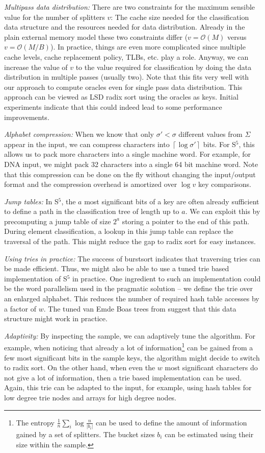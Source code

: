 \documentclass[a4paper]{myjournal}
\newcommand{\ceil}[1]{\left\lceil #1\right\rceil}
\newcommand{\Oh}[1]{\mathcal{O}\!\left( #1\right)}
\def\Oh#1{\mathcal{O}(#1)}
\begin{document}
\emph{Multipass data distribution:} There are two constraints for the maximum
sensible value for the number of splitters $v$: The cache size needed for the
classification data structure and the resources needed for data
distribution. Already in the plain external memory model these two constraints
differ ($v=\Oh{M}$ versus $v=\Oh{M/B}$). In practice, things are even more
complicated since multiple cache levels, cache replacement policy, TLBs,
etc. play a role. Anyway, we can increase the value of $v$ to the value required
for classification by doing the data distribution in multiple passes (usually
two).  Note that this fits very well with our approach to compute oracles even
for single pass data distribution. This approach can be viewed as LSD radix sort
using the oracles as keys. Initial experiments indicate that this could indeed
lead to some performance improvements.

\emph{Alphabet compression:} When we know that only $\sigma'<\sigma$ different
values from $\Sigma$ appear in the input, we can compress characters into
$\ceil{\log\sigma'}$ bits.  For S$^5$, this allows us to pack more characters
into a single machine word.  For example, for DNA input, we might pack 32
characters into a single 64 bit machine word. Note that this compression can be
done on the fly without changing the input/output format and the compression
overhead is amortized over $\log v$ key comparisons.

\emph{Jump tables:} In S$^5$, the $a$ most significant bits of a key are often
already sufficient to define a path in the classification tree of length up to
$a$.  We can exploit this by precomputing a jump table of size $2^a$ storing a
pointer to the end of this path. During element classification, a lookup in this
jump table can replace the traversal of the path.  This might reduce the gap to
radix sort for easy instances.

\emph{Using tries in practice:} The success of burstsort indicates that
traversing tries can be made efficient. Thus, we might also be able to use a
tuned trie based implementation of S$^5$ in practice. One ingredient to such an
implementation could be the word parallelism used in the pragmatic solution --
we define the trie over an enlarged alphabet. This reduces the number of
required hash table accesses by a factor of $w$. The tuned van Emde Boas trees
from \cite{dementiev2004sortedlist} suggest that this data structure might work
in practice.

\emph{Adaptivity:} By inspecting the sample, we can adaptively tune the
algorithm.  For example, when noticing that already a lot of information\footnote{The entropy $\frac{1}{n}\sum_i\log\frac{n}{|b_i|}$ can be used to
  define the amount of information gained by a set of splitters. The bucket
  sizes $b_i$ can be estimated using their size within the sample.} can be
gained from a few most significant bits in the sample keys, the algorithm might
decide to switch to radix sort. On the other hand, when even the $w$ most
significant characters do not give a lot of information, then a trie based
implementation can be used.  Again, this trie can be adapted to the input, for
example, using hash tables for low degree trie nodes and arrays for high degree
nodes.



\small


\end{document}

